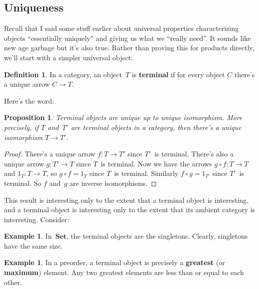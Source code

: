 \documentclass[letterpaper,12pt]{article}
\newcommand{\after}{\circ}
\newcommand{\cat}[1]{\mathbf{#1}}
\newcommand{\Set}{\cat{Set}}
\newcommand{\textdefn}{\textbf}
\theoremstyle{definition}
\newtheorem{defn}[equation]{Definition}
\newtheorem{exmp}[equation]{Example}
\theoremstyle{plain}
\newtheorem{prop}[equation]{Proposition}
\numberwithin{equation}{section}
\begin{document}
\subsection{Uniqueness}
Recall that I said some stuff earlier about universal properties characterizing objects ``essentially uniquely'' and giving us what we ``really need''. It sounds like new age garbage but it's also true. Rather than proving this for products directly, we'll start with a simpler universal object:
\begin{defn}
In a category, an object~\(T\) is \textdefn{terminal} if for every object \(C\) there's a unique arrow \(C\to T\).
\end{defn}
\noindent Here's the word:
\begin{prop}
Terminal objects are unique up to unique isomorphism. More precisely, if \(T\) and~\(T'\) are terminal objects in a category, then there's a unique isomorphism \(T\to T'\).\label{prop:terminalunique}
\end{prop}
\begin{proof}
There's a unique arrow \(f:T\to T'\) since \(T'\)~is terminal. There's also a unique arrow \(g:T'\to T\) since \(T\)~is terminal. Now we have the arrows \(g\after f:T\to T\) and \(1_T:T\to T\), so \(g\after f=1_T\) since \(T\)~is terminal. Similarly \(f\after g=1_{T'}\) since \(T'\)~is terminal. So \(f\) and~\(g\) are inverse isomorphisms.
\end{proof}
\noindent This result is interesting only to the extent that a terminal object is interesting, and a terminal object is interesting only to the extent that its ambient category is interesting. Consider:
\begin{exmp}
In~\(\Set\), the terminal objects are the singletons. Clearly, singletons have the same size.
\end{exmp}
\begin{exmp}
In a preorder, a terminal object is precisely a \textdefn{greatest} (or \textdefn{maximum}) element. Any two greatest elements are less than or equal to each other.
\end{exmp}
\end{document}
